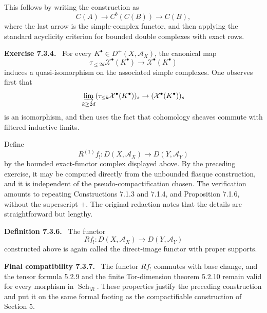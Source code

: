 \documentclass[12pt]{article}
\newcommand{\Aa}{\mathcal A}
\newcommand{\Xx}{\mathcal X}
\DeclareMathOperator{\Sch}{Sch}
\newenvironment{statement}[1]{\par\medskip\noindent\textbf{#1.}\ }{\par\medskip}
\newenvironment{remarktext}[1]{\par\medskip\noindent\textbf{#1.}\ }{\par\medskip}
\begin{document}
This follows by writing the construction as
\[
C(A)\to C^b(C(B))\to C(B),
\]
where the last arrow is the simple-complex functor, and then applying the standard acyclicity criterion for bounded double complexes with exact rows.

\begin{remarktext}{Exercise 7.3.4}
For every \(K^\bullet\in D^+(X,\Aa_X)\), the canonical map
\[
\tau_{\le2d}\Xx^\bullet(K^\bullet)\to\Xx^\bullet(K^\bullet)
\]
induces a quasi-isomorphism on the associated simple complexes. One observes first that
\[
\varinjlim_{k\ge2d}(\tau_{\le k}\Xx^\bullet(K^\bullet))_s
\to
(\Xx^\bullet(K^\bullet))_s
\]
is an isomorphism, and then uses the fact that cohomology sheaves commute with filtered inductive limits.
\end{remarktext}

Define
\[
R^{(1)}f_!:D(X,\Aa_X)\to D(Y,\Aa_Y)
\]
by the bounded exact-functor complex displayed above. By the preceding exercise, it may be computed directly from the unbounded flasque construction, and it is independent of the pseudo-compactification chosen. The verification amounts to repeating Constructions 7.1.3 and 7.1.4, and Proposition 7.1.6, without the superscript \(+\). The original redaction notes that the details are straightforward but lengthy.

\begin{statement}{Definition 7.3.6}
The functor
\[
Rf_!:D(X,\Aa_X)\to D(Y,\Aa_Y)
\]
constructed above is again called the direct-image functor with proper supports.
\end{statement}

\begin{statement}{Final compatibility 7.3.7}
The functor \(Rf_!\) commutes with base change, and the tensor formula 5.2.9 and the finite Tor-dimension theorem 5.2.10 remain valid for every morphism in \(\Sch_{!R}\). These properties justify the preceding construction and put it on the same formal footing as the compactifiable construction of Section 5.
\end{statement}
\end{document}
